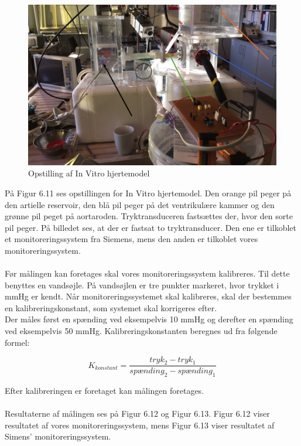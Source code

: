 \begin{figure}[H]
	\centering
	\includegraphics[width=1\textwidth]{Figurer/Snip20151214_98}
	\caption{Opstilling af In Vitro hjertemodel}
\end{figure}

På Figur 6.11 ses opstillingen for In Vitro hjertemodel. Den orange pil peger på den artielle reservoir, den blå pil peger på det ventrikulære kammer og den grønne pil peget på aortaroden. Tryktransduceren fastsættes der, hvor den sorte pil peger. På billedet ses, at der er fastsat to tryktransducer. Den ene er tilkoblet et monitoreringssystem fra Siemens, mens den anden er tilkoblet vores monitoreringssystem.
\\\\
Før målingen kan foretages skal vores monitoreringssystem kalibreres. Til dette benyttes en vandsøjle. På vandsøjlen er tre punkter markeret, hvor trykket i mmHg er kendt. Når monitoreringssystemet skal kalibreres, skal der bestemmes en kalibreringskonstant, som systemet skal korrigeres efter. \\
Der måles først en spænding ved eksempelvis 10 mmHg og derefter en spænding ved eksempelvis 50 mmHg. Kalibreringskonstanten beregnes ud fra følgende formel: 

\begin{equation}
	K_{konstant} = \frac{tryk_2 - tryk_1}{spænding_2 - spænding_1}
\end{equation}

Efter kalibreringen er foretaget kan målingen foretages. 
\\\\

Resultaterne af målingen ses på Figur 6.12 og Figur 6.13. Figur 6.12 viser resultatet af vores monitoreringssystem, mens Figur 6.13 viser resultatet af Simens’ monitoreringssystem. 

